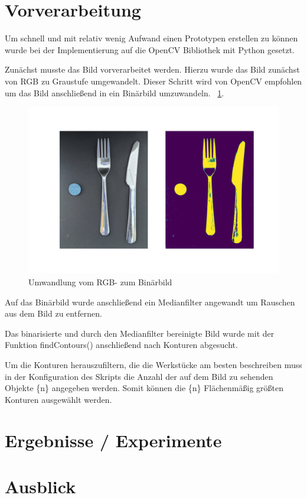 \documentclass[twocolumn,10pt]{asme2ej}
\begin{document}
\section{Vorverarbeitung} 

Um schnell und mit relativ wenig Aufwand einen Prototypen erstellen zu können wurde bei der Implementierung auf die OpenCV Bibliothek mit Python gesetzt. 

Zunächst musste das Bild vorverarbeitet werden. Hierzu wurde das Bild zunächst von RGB zu Graustufe umgewandelt. Dieser Schritt wird von OpenCV empfohlen um das Bild anschließend in ein Binärbild umzuwandeln. ~\ref{fig:bin}.

\begin{figure}
	\includegraphics[scale=0.2]{binarization}
	\caption[center]{Umwandlung vom RGB- zum Binärbild}
	\label{fig:bin}
\end{figure}

Auf das Binärbild wurde anschließend ein Medianfilter angewandt um Rauschen aus dem Bild zu entfernen.

Das binarisierte und durch den Medianfilter bereinigte Bild wurde mit der Funktion findContours() anschließend nach Konturen abgesucht.

Um die Konturen herauszufiltern, die die Werkstücke am besten beschreiben muss in der Konfiguration des Skripts die Anzahl der auf dem Bild zu sehenden Objekte \{n\} angegeben werden. 
Somit können die \{n\} Flächenmäßig größten Konturen ausgewählt werden.

\section{Ergebnisse / Experimente}

\section{Ausblick}




\end{document}
